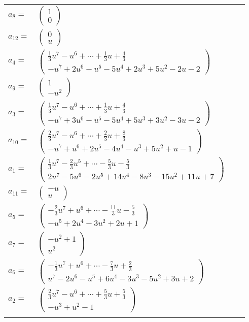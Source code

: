 \documentclass[1p]{elsarticle_modified}
\theoremstyle{definition}
\begin{document}
\begin{tabular}{m{7pt} m{180pt} m{7pt} m{180pt} }
\flushright $a_{8}=$&$\begin{pmatrix}1\\0\end{pmatrix}$ \\
\flushright $a_{12}=$&$\begin{pmatrix}0\\u\end{pmatrix}$ \\
\flushright $a_{4}=$&$\begin{pmatrix}\frac{1}{3} u^7- u^6+\cdots+\frac{1}{3} u+\frac{4}{3}\\- u^7+2 u^6+u^5-5 u^4+2 u^3+5 u^2-2 u-2\end{pmatrix}$ \\
\flushright $a_{9}=$&$\begin{pmatrix}1\\- u^2\end{pmatrix}$ \\
\flushright $a_{3}=$&$\begin{pmatrix}\frac{1}{3} u^7- u^6+\cdots+\frac{1}{3} u+\frac{4}{3}\\- u^7+3 u^6- u^5-5 u^4+5 u^3+3 u^2-3 u-2\end{pmatrix}$ \\
\flushright $a_{10}=$&$\begin{pmatrix}\frac{2}{3} u^7- u^6+\cdots+\frac{2}{3} u+\frac{8}{3}\\- u^7+u^6+2 u^5-4 u^4- u^3+5 u^2+u-1\end{pmatrix}$ \\
\flushright $a_{1}=$&$\begin{pmatrix}\frac{1}{3} u^7-\frac{2}{3} u^5+\cdots-\frac{5}{3} u-\frac{5}{3}\\2 u^7-5 u^6-2 u^5+14 u^4-8 u^3-15 u^2+11 u+7\end{pmatrix}$ \\
\flushright $a_{11}=$&$\begin{pmatrix}- u\\u\end{pmatrix}$ \\
\flushright $a_{5}=$&$\begin{pmatrix}-\frac{2}{3} u^7+u^6+\cdots-\frac{11}{3} u-\frac{5}{3}\\- u^5+2 u^4-3 u^2+2 u+1\end{pmatrix}$ \\
\flushright $a_{7}=$&$\begin{pmatrix}- u^2+1\\u^2\end{pmatrix}$ \\
\flushright $a_{6}=$&$\begin{pmatrix}-\frac{1}{3} u^7+u^6+\cdots-\frac{7}{3} u+\frac{2}{3}\\u^7-2 u^6- u^5+6 u^4-3 u^3-5 u^2+3 u+2\end{pmatrix}$ \\
\flushright $a_{2}=$&$\begin{pmatrix}\frac{2}{3} u^7- u^6+\cdots+\frac{5}{3} u+\frac{5}{3}\\- u^3+u^2-1\end{pmatrix}$\\&\end{tabular}
\end{document}
